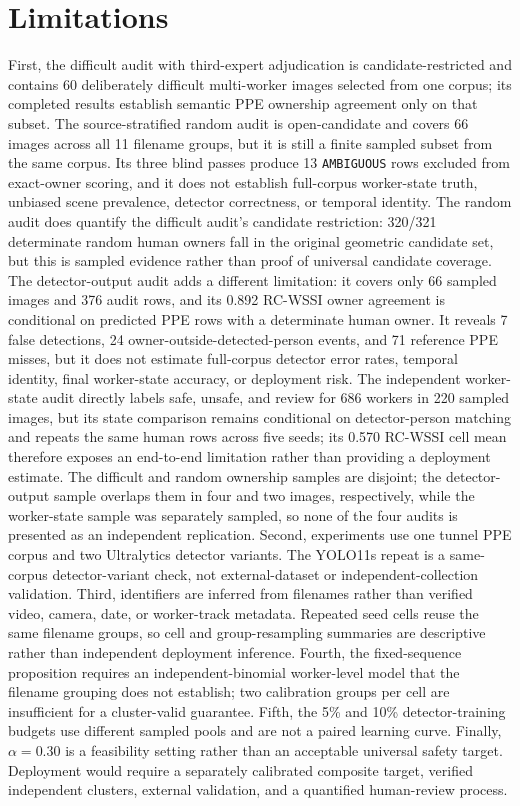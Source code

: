 \documentclass[iicol,pdflatex,sn-mathphys-num]{sn-jnl}
\begin{document}
\section{Limitations}\label{sec:limitations}

First, the difficult audit with third-expert adjudication is candidate-restricted and contains 60 deliberately difficult multi-worker images selected from one corpus; its completed results establish semantic PPE ownership agreement only on that subset. The source-stratified random audit is open-candidate and covers 66 images across all 11 filename groups, but it is still a finite sampled subset from the same corpus. Its three blind passes produce 13 \texttt{AMBIGUOUS} rows excluded from exact-owner scoring, and it does not establish full-corpus worker-state truth, unbiased scene prevalence, detector correctness, or temporal identity. The random audit does quantify the difficult audit's candidate restriction: 320/321 determinate random human owners fall in the original geometric candidate set, but this is sampled evidence rather than proof of universal candidate coverage. The detector-output audit adds a different limitation: it covers only 66 sampled images and 376 audit rows, and its 0.892 RC-WSSI owner agreement is conditional on predicted PPE rows with a determinate human owner. It reveals 7 false detections, 24 owner-outside-detected-person events, and 71 reference PPE misses, but it does not estimate full-corpus detector error rates, temporal identity, final worker-state accuracy, or deployment risk. The independent worker-state audit directly labels safe, unsafe, and review for 686 workers in 220 sampled images, but its state comparison remains conditional on detector-person matching and repeats the same human rows across five seeds; its 0.570 RC-WSSI cell mean therefore exposes an end-to-end limitation rather than providing a deployment estimate. The difficult and random ownership samples are disjoint; the detector-output sample overlaps them in four and two images, respectively, while the worker-state sample was separately sampled, so none of the four audits is presented as an independent replication. Second, experiments use one tunnel PPE corpus and two Ultralytics detector variants. The YOLO11s repeat is a same-corpus detector-variant check, not external-dataset or independent-collection validation. Third, identifiers are inferred from filenames rather than verified video, camera, date, or worker-track metadata. Repeated seed cells reuse the same filename groups, so cell and group-resampling summaries are descriptive rather than independent deployment inference. Fourth, the fixed-sequence proposition requires an independent-binomial worker-level model that the filename grouping does not establish; two calibration groups per cell are insufficient for a cluster-valid guarantee. Fifth, the 5\% and 10\% detector-training budgets use different sampled pools and are not a paired learning curve. Finally, $\alpha=0.30$ is a feasibility setting rather than an acceptable universal safety target. Deployment would require a separately calibrated composite target, verified independent clusters, external validation, and a quantified human-review process.
\end{document}
